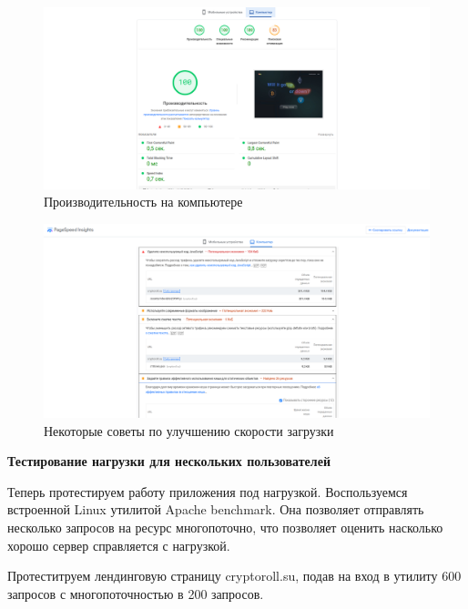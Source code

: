 \documentclass[a4paper, 12pt]{article}
\begin{document}
\newpage
\begin{figure}[h!]
    \noindent
    \centering
    \includegraphics[width=1\linewidth]{pic_web_2.png}
    \caption{Производительность на компьютере}
\end{figure}

\begin{figure}[h!]
    \noindent
    \centering
    \includegraphics[width=1\linewidth]{pic_web_3.png}
    \caption{Некоторые советы по улучшению скорости загрузки}
\end{figure}

\textbf{Тестирование нагрузки для нескольких пользователей}

Теперь протестируем работу приложения под нагрузкой. Воспользуемся встроенной Linux утилитой Apache benchmark. Она позволяет отправлять несколько запросов на ресурс многопоточно, что позволяет оценить насколько хорошо сервер справляется с нагрузкой.

Протеститруем лендинговую страницу cryptoroll.su, подав на вход в утилиту 600 запросов с многопоточностью в 200 запросов.
\end{document}
